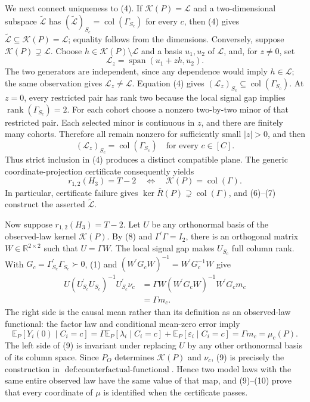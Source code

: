 We next connect uniqueness to (4). If \(\mathcal K(P)=\mathcal L\) and a two-dimensional subspace \(\widetilde{\mathcal L}\) has \((\widetilde{\mathcal L})_{S_c}=\operatorname{col}(\Gamma_{S_c})\) for every \(c\), then (4) gives \(\widetilde{\mathcal L}\subseteq\mathcal K(P)=\mathcal L\); equality follows from the dimensions. Conversely, suppose \(\mathcal K(P)\supsetneq\mathcal L\). Choose \(h\in\mathcal K(P)\setminus\mathcal L\) and a basis \(u_1,u_2\) of \(\mathcal L\), and, for \(z\neq0\), set
\[
\mathcal L_z=\operatorname{span}(u_1+zh,u_2).
\tag{6}
\]
The two generators are independent, since any dependence would imply \(h\in\mathcal L\); the same observation gives \(\mathcal L_z\neq\mathcal L\). Equation (4) gives \((\mathcal L_z)_{S_c}\subseteq\operatorname{col}(\Gamma_{S_c})\). At \(z=0\), every restricted pair has rank two because the local signal gap implies \(\operatorname{rank}(\Gamma_{S_c})=2\). For each cohort choose a nonzero two-by-two minor of that restricted pair. Each selected minor is continuous in \(z\), and there are finitely many cohorts. Therefore all remain nonzero for sufficiently small \(|z|>0\), and then
\[
(\mathcal L_z)_{S_c}=\operatorname{col}(\Gamma_{S_c})
\quad\text{for every }c\in[C].
\tag{7}
\]
Thus strict inclusion in (4) produces a distinct compatible plane. The generic coordinate-projection certificate consequently yields
\[
r_{1,2}(H_3)=T-2
\quad\Longleftrightarrow\quad
\mathcal K(P)=\operatorname{col}(\Gamma).
\tag{8}
\]
In particular, certificate failure gives \(\ker\overline R(P)\supsetneq\operatorname{col}(\Gamma)\), and (6)--(7) construct the asserted \(\widetilde{\mathcal L}\).

Now suppose \(r_{1,2}(H_3)=T-2\). Let \(U\) be any orthonormal basis of the observed-law kernel \(\mathcal K(P)\). By (8) and \(\Gamma^{\prime}\Gamma=I_2\), there is an orthogonal matrix \(W\in\mathbb R^{2\times2}\) such that \(U=\Gamma W\). The local signal gap makes \(U_{S_c}\) full column rank. With \(G_c=\Gamma_{S_c}^{\prime}\Gamma_{S_c}\succ0\), (1) and \((W^{\prime}G_cW)^{-1}=W^{\prime}G_c^{-1}W\) give
\[
\begin{aligned}
U(U_{S_c}^{\prime}U_{S_c})^{-1}U_{S_c}^{\prime}\nu_c
&=\Gamma W(W^{\prime}G_cW)^{-1}W^{\prime}G_cm_c\\
&=\Gamma m_c.
\end{aligned}
\tag{9}
\]
The right side is the causal mean rather than its definition as an observed-law functional: the factor law and conditional mean-zero error imply
\[
\mathbb E_P[Y_i(0)\mid C_i=c]
=\Gamma\mathbb E_P[\lambda_i\mid C_i=c]
+\mathbb E_P[\varepsilon_i\mid C_i=c]
=\Gamma m_c=\mu_c(P).
\tag{10}
\]
The left side of (9) is invariant under replacing \(U\) by any other orthonormal basis of its column space. Since \(P_O\) determines \(\mathcal K(P)\) and \(\nu_c\), (9) is precisely the construction in \(\operatorname{def:counterfactual\text{-}functional}\). Hence two model laws with the same entire observed law have the same value of that map, and (9)--(10) prove that every coordinate of \(\mu\) is identified when the certificate passes.

